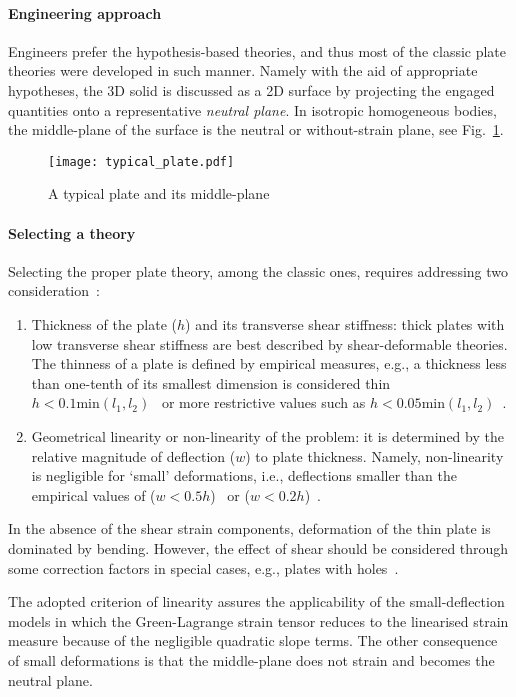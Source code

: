 	\paragraph{Engineering approach} Engineers prefer the hypothesis-based theories, and thus most of the classic plate theories were developed in such manner. Namely with the aid of appropriate hypotheses, the 3D solid is discussed as a 2D surface by projecting the engaged quantities onto a representative \textit{neutral plane}.  In isotropic homogeneous bodies, the middle-plane of the surface is the neutral or without-strain plane, see Fig.~\ref{fig:generalplate}.

\begin{figure}[!h]
\centering
\texttt{[image: typical\_plate.pdf]}
\caption{A typical plate and its middle-plane}\label{fig:generalplate}
\end{figure}

	\paragraph{Selecting a theory} Selecting the proper plate theory, among the classic ones, requires addressing two consideration~\autocite{Birman.2011}:
	\begin{enumerate}
		\item Thickness of the plate ($h$) and its transverse shear stiffness: thick plates with low transverse shear stiffness are best described by shear-deformable theories. The thinness of a plate is defined by empirical measures, e.g., a thickness less than one-tenth of its smallest dimension is considered thin $h<0.1\text{min}(l_1,l_2)$~\autocite{Altenbach.2008} or more restrictive values such as $h<0.05\text{min}(l_1,l_2)$~\autocite{Ugural.2010}. 
		\item Geometrical linearity or non-linearity of the problem: it is determined by the relative magnitude of deflection ($w$) to plate thickness. Namely, non-linearity is negligible for `small' deformations, i.e., deflections smaller than the empirical values of ($w<0.5h$)~\autocite{Birman.2011} or ($w<0.2h$)~\autocite{Altenbach.2008}. 
	\end{enumerate}
	In the absence of the shear strain components, deformation of the thin plate is dominated by bending. However, the effect of shear should be considered through some correction factors in special cases, e.g., plates with holes~\autocite{Timoshenko.1959}.

The adopted criterion of linearity assures the applicability of the small-deflection models in which the Green-Lagrange strain tensor reduces to the linearised strain measure because of the negligible quadratic slope terms. The other consequence of small deformations is that the middle-plane does not strain and becomes the neutral plane.


